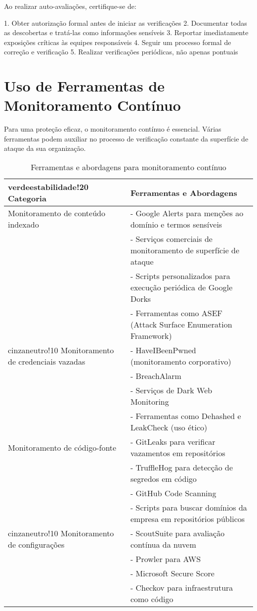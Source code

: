 \documentclass[12pt,a4paper]{book}
\begin{document}
\begin{alertbox}
Ao realizar auto-avaliações, certifique-se de:

1. Obter autorização formal antes de iniciar as verificações
2. Documentar todas as descobertas e tratá-las como informações sensíveis
3. Reportar imediatamente exposições críticas às equipes responsáveis
4. Seguir um processo formal de correção e verificação
5. Realizar verificações periódicas, não apenas pontuais
\end{alertbox}

\section{Uso de Ferramentas de Monitoramento Contínuo}

Para uma proteção eficaz, o monitoramento contínuo é essencial. Várias ferramentas podem auxiliar no processo de verificação constante da superfície de ataque da sua organização.

\begin{table}[h]
\centering
\begin{tabular}{|p{3.5cm}|p{11.5cm}|}
\hline
{verdeestabilidade!20} \textbf{Categoria} & \textbf{Ferramentas e Abordagens} \\
\hline
Monitoramento de conteúdo indexado & - Google Alerts para menções ao domínio e termos sensíveis \\
& - Serviços comerciais de monitoramento de superfície de ataque \\
& - Scripts personalizados para execução periódica de Google Dorks \\
& - Ferramentas como ASEF (Attack Surface Enumeration Framework) \\
\hline
{cinzaneutro!10} Monitoramento de credenciais vazadas & - HaveIBeenPwned (monitoramento corporativo) \\
& - BreachAlarm \\
& - Serviços de Dark Web Monitoring \\
& - Ferramentas como Dehashed e LeakCheck (uso ético) \\
\hline
Monitoramento de código-fonte & - GitLeaks para verificar vazamentos em repositórios \\
& - TruffleHog para detecção de segredos em código \\
& - GitHub Code Scanning \\
& - Scripts para buscar domínios da empresa em repositórios públicos \\
\hline
{cinzaneutro!10} Monitoramento de configurações & - ScoutSuite para avaliação contínua da nuvem \\
& - Prowler para AWS \\
& - Microsoft Secure Score \\
& - Checkov para infraestrutura como código \\
\hline
\end{tabular}
\caption{Ferramentas e abordagens para monitoramento contínuo}
\end{table}
\end{document}
